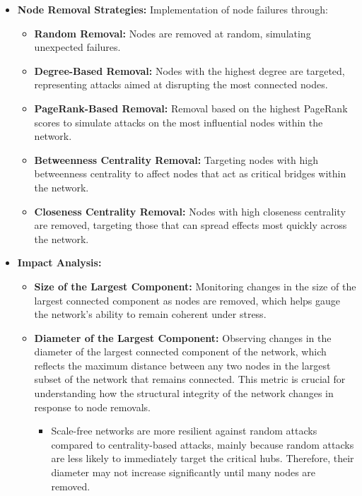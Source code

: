 \documentclass[
	report, %
	11pt, %
]{CSUniSchoolLabReport}
\newcounter{ct}
\begin{document}
\begin{itemize}
	\item \textbf{Node Removal Strategies:} Implementation of node failures through:
\begin{itemize}
	\item \textbf{Random Removal:} Nodes are removed at random, simulating unexpected failures.
	\item \textbf{Degree-Based Removal:} Nodes with the highest degree are targeted, representing attacks aimed at disrupting the most connected nodes.
	\item \textbf{PageRank-Based Removal:} Removal based on the highest PageRank scores to simulate attacks on the most influential nodes within the network.
	\item \textbf{Betweenness Centrality Removal:} Targeting nodes with high betweenness centrality to affect nodes that act as critical bridges within the network.
	\item \textbf{Closeness Centrality Removal:} Nodes with high closeness centrality are removed, targeting those that can spread effects most quickly across the network.
\end{itemize}
	\item \textbf{Impact Analysis:}
\begin{itemize}
	\item \textbf{Size of the Largest Component:} Monitoring changes in the size of the largest connected component as nodes are removed, which helps gauge the network's ability to remain coherent under stress.
	\item \textbf{Diameter of the Largest Component:} Observing changes in the diameter of the largest connected component of the network, which reflects the maximum distance between any two nodes in the largest subset of the network that remains connected. This metric is crucial for understanding how the structural integrity of the network changes in response to node removals.
	\begin{itemize}
		\item Scale-free networks are more resilient against random attacks compared to centrality-based attacks, mainly because random attacks are less likely to immediately target the critical hubs. Therefore, their diameter may not increase significantly until many nodes are removed.
	\end{itemize} 
	\end{itemize}
\end{itemize}
\end{document}
